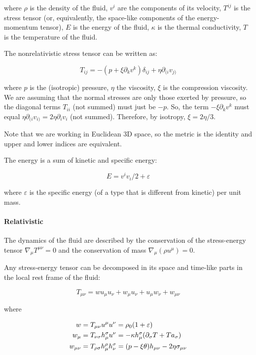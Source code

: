 \documentclass[main.tex]{subfiles}
\begin{document}
where $\rho$ is the density of the fluid,
$v^i$ are the components of its velocity,
$T^{ij}$ is the stress tensor (or, equivalently, the space-like components of the energy-momentum tensor),
$E$ is the energy of the fluid,
$\kappa$ is the thermal conductivity,
$T$ is the temperature of the fluid.

The nonrelativistic stress tensor can be written as:

\begin{equation}
    T_{ij} = -(p + \xi \partial_k v^k ) \delta_{ij} + \eta \partial_{(i} v_{j)}
\end{equation}

where $p$ is the (isotropic) pressure, $\eta$ the viscosity, $\xi$ is the compression viscosity. We are assuming that the normal stresses are only those exerted by pressure, so the diagonal terms $T_{ii}$ (not summed) must just be $-p$. So, the term $-\xi \partial_k v^k$ must equal $\eta \partial_{(i} v_{i)} = 2\eta \partial_i v_i$ (not summed). Therefore, by isotropy, $\xi = 2\eta/3$.

Note that we are working in Euclidean 3D space, so the metric is the identity and upper and lower indices are equivalent.

The energy is a sum of kinetic and specific energy:

\begin{equation}
    E = v^i v_i /2 + \varepsilon
\end{equation}

where $\varepsilon$ is the specific energy (of a type that is different from kinetic) per unit mass.

\paragraph{Relativistic}

The dynamics of the fluid are described by the conservation of the stress-energy tensor \(\nabla_\mu T ^{\mu \nu} =0\) and the conservation of mass \(\nabla_\mu (\rho u^\mu) =0\).

Any stress-energy tensor can be decomposed in its space and time-like parts in the local rest frame of the fluid:

\begin{equation}
    T_{\mu \nu} = w u_\mu u_\nu + w_\mu u_\nu + u_\mu w_\nu + w _{\mu \nu}
\end{equation}

where

\begin{subequations}
\begin{align}
  w &=  T _{\mu \nu} u^\mu u^\nu = \rho_0 (1 + \varepsilon) \\
  w_\mu &= T _{\nu \sigma} h^\sigma _\mu u^\nu  = -\kappa h_\mu ^\sigma  \qty(\partial_\sigma T + T a_\sigma)\\
  w_{\mu \nu} &= T_{\rho \sigma} h^\rho _\mu h^\sigma_\nu = \qty(p - \xi \theta) h_{\mu \nu} - 2 \eta \sigma_{\mu \nu}
\end{align}
\end{subequations}
\end{document}
